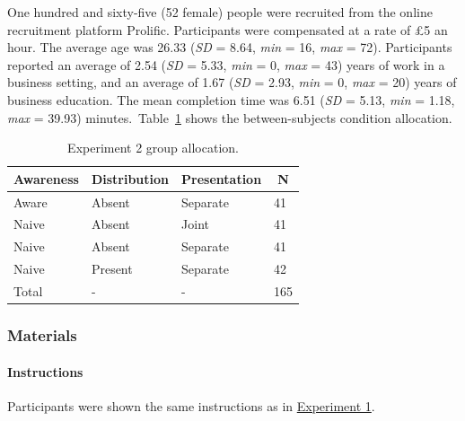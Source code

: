 \documentclass[a4paper, nobind, dvipsnames]{templates/ociamthesis}
\theoremstyle{definition}
\theoremstyle{definition}
\theoremstyle{definition}
\theoremstyle{definition}
\theoremstyle{remark}
\begin{document}
One hundred and sixty-five (52 female) people were recruited from the online recruitment platform Prolific. Participants were compensated at a rate of £5 an hour. The average age was 26.33 (\emph{SD} = 8.64, \emph{min} = 16, \emph{max} = 72). Participants reported an average of 2.54 (\emph{SD} = 5.33, \emph{min} = 0, \emph{max} = 43) years of work in a business setting, and an average of 1.67 (\emph{SD} = 2.93, \emph{min} = 0, \emph{max} = 20) years of business education. The mean completion time was 6.51 (\emph{SD} = 5.13, \emph{min} = 1.18, \emph{max} = 39.93) minutes.~Table~\ref{tab:condition-allocation-aggregation-2}
shows the between-subjects condition allocation.

\begin{table}[tbp]

\begin{center}
\begin{threeparttable}

\caption{\label{tab:condition-allocation-aggregation-2}Experiment 2 group allocation.}

\begin{tabular}{llll}
\toprule
Awareness & \multicolumn{1}{c}{Distribution} & \multicolumn{1}{c}{Presentation} & \multicolumn{1}{c}{N}\\
\midrule
Aware & Absent & Separate & 41\\
Naive & Absent & Joint & 41\\
Naive & Absent & Separate & 41\\
Naive & Present & Separate & 42\\
Total & - & - & 165\\
\bottomrule
\end{tabular}

\end{threeparttable}
\end{center}

\end{table}

\subsubsection{Materials}

\paragraph{Instructions}

Participants were shown the same instructions as in
\protect\hyperlink{instructions-materials-aggregation-1}{Experiment 1}.
\end{document}
